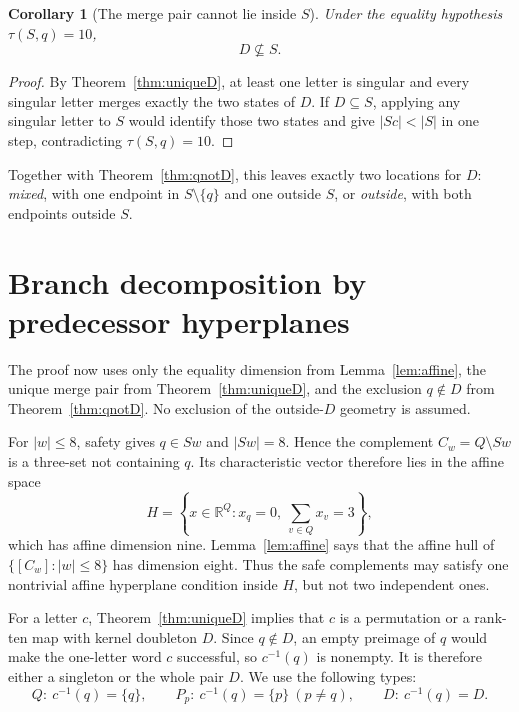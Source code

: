 \documentclass[11pt]{article}
\newtheorem{corollary}{Corollary}
\theoremstyle{definition}
\theoremstyle{remark}
\begin{document}
\begin{corollary}[The merge pair cannot lie inside $S$]\label{cor:DnotinS}
Under the equality hypothesis $\tau(S,q)=10$,
\[
D\nsubseteq S.
\]
\end{corollary}
\begin{proof}
By Theorem~\ref{thm:uniqueD}, at least one letter is singular and every singular letter merges exactly the two states of $D$. If $D\subseteq S$, applying any singular letter to $S$ would identify those two states and give $|Sc|<|S|$ in one step, contradicting $\tau(S,q)=10$.
\end{proof}

Together with Theorem~\ref{thm:qnotD}, this leaves exactly two locations for $D$: \emph{mixed}, with one endpoint in $S\setminus\{q\}$ and one outside $S$, or \emph{outside}, with both endpoints outside $S$.

\section{Branch decomposition by predecessor hyperplanes}\label{sec:branches}
The proof now uses only the equality dimension from Lemma~\ref{lem:affine}, the unique merge pair from Theorem~\ref{thm:uniqueD}, and the exclusion $q\notin D$ from Theorem~\ref{thm:qnotD}. No exclusion of the outside-$D$ geometry is assumed.

For $|w|\le8$, safety gives $q\in Sw$ and $|Sw|=8$. Hence the complement $C_w=Q\setminus Sw$ is a three-set not containing $q$. Its characteristic vector therefore lies in the affine space
\[
H=\left\{x\in\mathbb R^Q:x_q=0,\ \sum_{v\in Q}x_v=3\right\},
\]
which has affine dimension nine. Lemma~\ref{lem:affine} says that the affine hull of $\{[C_w]:|w|\le8\}$ has dimension eight. Thus the safe complements may satisfy one nontrivial affine hyperplane condition inside $H$, but not two independent ones.

For a letter $c$, Theorem~\ref{thm:uniqueD} implies that $c$ is a permutation or a rank-ten map with kernel doubleton $D$. Since $q\notin D$, an empty preimage of $q$ would make the one-letter word $c$ successful, so $c^{-1}(q)$ is nonempty. It is therefore either a singleton or the whole pair $D$. We use the following types:
\[
Q:\ c^{-1}(q)=\{q\},\qquad
P_p:\ c^{-1}(q)=\{p\}\ (p\ne q),\qquad
D:\ c^{-1}(q)=D.
\]
\end{document}
